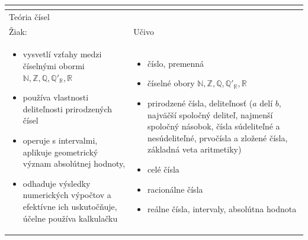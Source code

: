 \documentclass[11pt,a4paper,oneside,final]{book}
\newcommand{\NN}{\mathbb{N}}
\newcommand{\ZZ}{\mathbb{Z}}
\newcommand{\QQ}{\mathbb{Q}}
\newcommand{\RR}{\mathbb{R}}
\begin{document}
\begin{tabularx}{\textwidth}{X X}
\begin{itemize}
\end{itemize}\\
\hline
\multicolumn{2}{p{\textwidth}}{Teória čísel} \\
\hline
Žiak: & Učivo\\
\begin{itemize}
\item vysvetlí vzťahy medzi číselnými obormi $\NN, \ZZ, \QQ, \QQ'_{\RR}, \RR$
\item používa vlastnosti deliteľnosti prirodzených čísel
\item operuje s intervalmi, aplikuje geometrický význam absolútnej hodnoty,
\item odhaduje výsledky numerických výpočtov a efektívne ich uskutočňuje, účelne používa kalkulačku
\end{itemize} &
\begin{itemize}
\item číslo, premenná
\item číselné obory $\NN, \ZZ, \QQ, \QQ'_{\RR}, \RR$
\item prirodzené čísla, deliteľnosť ($a$ delí $b$, najväčší spoločný deliteľ, najmenší spoločný násobok, čísla súdeliteľné a nesúdeliteľné, prvočísla a zložené čísla, základná veta aritmetiky)
\item celé čísla
\item racionálne čísla
\item reálne čísla, intervaly, absolútna hodnota
\end{itemize}\\
\hline
\end{tabularx}
\end{document}
